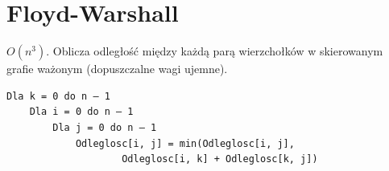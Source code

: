 \section{Floyd-Warshall}

$O(n^3)$. Oblicza odległość między każdą parą wierzchołków w skierowanym grafie ważonym (dopuszczalne wagi ujemne).

\begin{verbatim}
Dla k = 0 do n – 1
    Dla i = 0 do n – 1
        Dla j = 0 do n – 1
            Odleglosc[i, j] = min(Odleglosc[i, j], 
					Odleglosc[i, k] + Odleglosc[k, j])
\end{verbatim}
